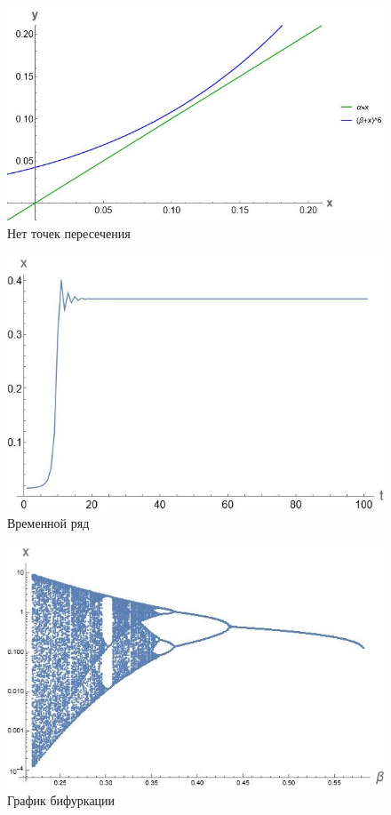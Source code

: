 \documentclass[14pt]{extarticle}
\begin{document}
        \begin{figure}[ht]
            \centering
            \includegraphics[width=\textwidth]{images/zero_intersection.jpg}
            \caption{Нет точек пересечения}
        \end{figure}

        \begin{figure}[ht]
            \centering
            \includegraphics[width=\textwidth]{images/time_series.jpg}
            \caption{Временной ряд}
        \end{figure}

        \begin{figure}[ht]
            \centering
            \includegraphics[width=\textwidth]{images/bifurcation.jpg}
            \caption{График бифуркации}
        \end{figure}
\end{document}
